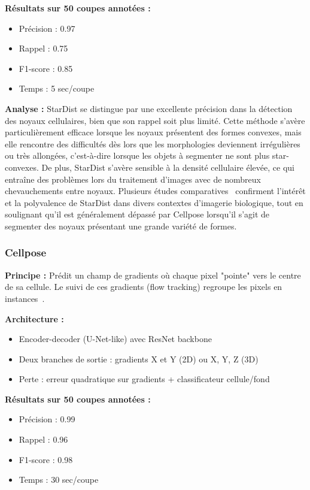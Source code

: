 \textbf{Résultats sur 50 coupes annotées :}
\begin{itemize}
    \item Précision : 0.97
    \item Rappel : 0.75
    \item F1-score : 0.85
    \item Temps : 5 sec/coupe
\end{itemize}

\textbf{Analyse :}
StarDist se distingue par une excellente précision dans la détection des noyaux cellulaires, bien que son rappel soit plus limité. Cette méthode s’avère particulièrement efficace lorsque les noyaux présentent des formes convexes, mais elle rencontre des difficultés dès lors que les morphologies deviennent irrégulières ou très allongées, c’est-à-dire lorsque les objets à segmenter ne sont plus star-convexes. De plus, StarDist s’avère sensible à la densité cellulaire élevée, ce qui entraîne des problèmes lors du traitement d’images avec de nombreux chevauchements entre noyaux. Plusieurs études comparatives~\cite{Weigert2022,Kleinberg2022} confirment l’intérêt et la polyvalence de StarDist dans divers contextes d’imagerie biologique, tout en soulignant qu’il est généralement dépassé par Cellpose lorsqu’il s’agit de segmenter des noyaux présentant une grande variété de formes.

\subsubsection{Cellpose}

\textbf{Principe :}
Prédit un champ de gradients où chaque pixel "pointe" vers le centre de sa cellule. Le suivi de ces gradients (flow tracking) regroupe les pixels en instances~\cite{Stringer2021}.

\textbf{Architecture :}
\begin{itemize}
    \item Encoder-decoder (U-Net-like) avec ResNet backbone
    \item Deux branches de sortie : gradients X et Y (2D) ou X, Y, Z (3D)
    \item Perte : erreur quadratique sur gradients + classificateur cellule/fond
\end{itemize}

\textbf{Résultats sur 50 coupes annotées :}
\begin{itemize}
    \item Précision : 0.99
    \item Rappel : 0.96
    \item F1-score : 0.98
    \item Temps : 30 sec/coupe
\end{itemize}

